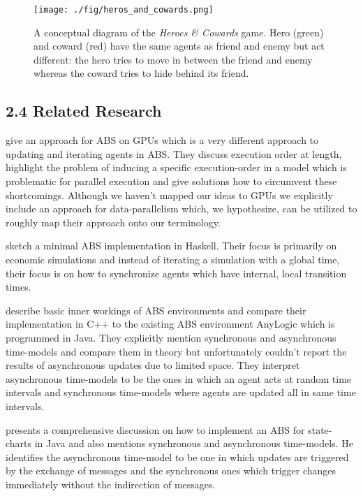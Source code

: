 \begin{figure}
	\centering
	\texttt{[image: ./fig/heros\_and\_cowards.png]}
	\caption{A conceptual diagram of the \textit{Heroes \& Cowards} game. Hero (green) and coward (red) have the same agents as friend and enemy but act different: the hero tries to move in between the friend and enemy whereas the coward tries to hide behind its friend.}
	\label{fig:heros_and_cowards}
\end{figure}

\subsection{2.4 Related Research}
\cite{lysenko_framework_2008} give an approach for ABS on GPUs which is a very different approach to updating and iterating agents in ABS. They discuss execution order at length, highlight the problem of inducing a specific execution-order in a model which is problematic for parallel execution and give solutions how to circumvent these shortcomings. Although we haven't mapped our ideas to GPUs we explicitly include an approach for data-parallelism which, we hypothesize, can be utilized to roughly map their approach onto our terminology. 
	
\cite{botta_time_2010} sketch a minimal ABS implementation in Haskell. Their focus is primarily on economic simulations and instead of iterating a simulation with a global time, their focus is on how to synchronize agents which have internal, local transition times. 

\cite{dawson_opening_2014} describe basic inner workings of ABS environments and compare their implementation in C++ to the existing ABS environment AnyLogic which is programmed in Java. They explicitly mention synchronous and asynchronous time-models and compare them in theory but unfortunately couldn't report the results of asynchronous updates due to limited space. They interpret asynchronous time-models to be the ones in which an agent acts at random time intervals and synchronous time-models where agents are updated all in same time intervals.

\cite{yuxuan_agent-based_2016} presents a comprehensive discussion on how to implement an ABS for state-charts in Java and also mentions synchronous and asynchronous time-models. He identifies the asynchronous time-model to be one in which updates are triggered by the exchange of messages and the synchronous ones which trigger changes immediately without the indirection of messages.

